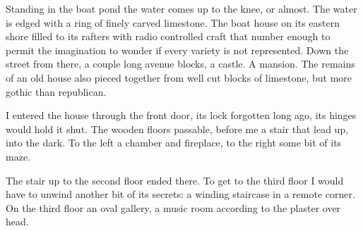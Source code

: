 

Standing in the boat pond the water comes up to the knee, or almost.
The water is edged with a ring of finely carved limestone.  The boat
house on its eastern shore filled to its rafters with radio controlled
craft that number enough to permit the imagination to wonder if every
variety is not represented.  Down the street from there, a couple long
avenue blocks, a castle.  A mansion.  The remains of an old house also
pieced together from well cut blocks of limestone, but more gothic
than republican.

I entered the house through the front door, its lock forgotten long
ago, its hinges would hold it shut.  The wooden floors passable,
before me a stair that lead up, into the dark.  To the left a chamber
and fireplace, to the right some bit of its maze.

The stair up to the second floor ended there.  To get to the third
floor I would have to unwind another bit of its secrets: a winding
staircase in a remote corner.  On the third floor an oval gallery, a
music room according to the plaster over head.

\bye
